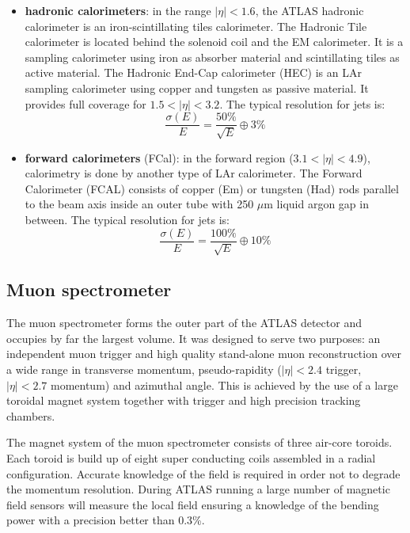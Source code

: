 \documentclass[a4paper, oneside, 11pt, openright]{book}
\begin{document}
\begin{itemize}
\begin{table}[h!]
						\end{table}
										
						\item \textbf{hadronic calorimeters}:
						in the range $|\eta|<1.6$, the ATLAS hadronic calorimeter is an iron-scintillating tiles calorimeter. The Hadronic Tile calorimeter is located behind the solenoid coil and the EM calorimeter. It is a sampling calorimeter using iron as absorber material and scintillating tiles as active material. The Hadronic End-Cap calorimeter (HEC) is an LAr sampling calorimeter using copper and tungsten as passive material. It provides full coverage for $1.5<|\eta|<3.2$. The typical resolution for jets is:
						$$ 
						\frac{\sigma(E)}{E} = \frac{50\%}{\sqrt{E}} \oplus 3\%
						$$
						\item \textbf{forward calorimeters} (FCal):
						in the forward region ($3.1<|\eta|<4.9$), calorimetry is done by another type of LAr calorimeter. The Forward Calorimeter (FCAL) consists of copper (Em) or tungsten (Had) rods parallel to the beam axis inside an outer tube with 250 $\mu$m liquid argon gap in between. The typical resolution for jets is:
						$$ 
						\frac{\sigma(E)}{E} = \frac{100\%}{\sqrt{E}} \oplus 10\%
						$$
					\end{itemize}
		
		
				\subsection{Muon spectrometer}
					The  muon  spectrometer \cite{Muon system} \cite{Muon TDR} forms  the  outer  part  of  the  ATLAS  detector  and occupies by far the largest volume. It was designed to serve two purposes: an independent muon trigger and high quality stand-alone muon reconstruction over a wide range in transverse momentum, pseudo-rapidity ($|\eta|<2.4$ trigger, $|\eta|<2.7$ momentum) and azimuthal angle. This is achieved by the use of a large toroidal magnet system together with trigger and high precision tracking chambers.
					
					The magnet system of the muon spectrometer consists of three air-core toroids. Each toroid is build up of eight super conducting coils assembled in a radial configuration. Accurate knowledge of the field is required in order not to degrade the momentum resolution. During ATLAS running a large number of magnetic field sensors will measure the local field ensuring a knowledge of the bending power with a precision better than 0.3\%. 
					
\end{document}
